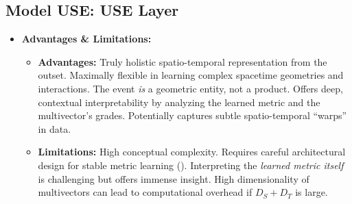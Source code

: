 \documentclass[11pt]{article}
\newcommand{\Cl}[2]{\text{Cl}(#1, #2)} %
\newcommand{\Ds}{D_S} %
\newcommand{\Dt}{D_T} %
\newcommand{\Hst}{h_{ST}} %
\newcommand{\Mvec}{\mathbf{M}} %
\newcommand{\CASMnet}{\text{CASM-Net}}
\newcommand{\SMPN}{\text{SMPN}}
\newenvironment{modeldescription}[1]{%
    \subsection*{Model #1: \MakeUppercase{#1} Layer}%
    \begin{itemize}[leftmargin=*,noitemsep]%
}{%
    \end{itemize}%
}
\begin{document}
\begin{modeldescription}{USE}
\begin{enumerate}[noitemsep]
\begin{itemize}[noitemsep]
            \item A learnable \textbf{Spacetime Multivector Parameterization Network (\SMPN)} \textit{also} takes $\Hst(k)$ as input.
                \begin{itemize}[noitemsep]
                    \item \texttt{SMPN\_input = \Hst(k)}.
                    \item \texttt{M\_k\_multivector\_coeffs = SMPN(SMPN\_input)}.
                \end{itemize}
            \item \textbf{\SMPN \ Output Interpretation:} \texttt{M\_k\_multivector\_coeffs} is a tensor containing the coefficients for \textit{all $2^{(\Ds+\Dt)}$ basis blades} of the general multivector $\Mvec_k \in \Cl{\Ds}{\Dt}$.
            \item \texttt{M\_k = sum(M\_k\_multivector\_coeffs[idx] * BasisBlade\_idx\_for\_event\_k)}.
            \item \textbf{Key Distinction:} $\Mvec_k$ is formed directly by the \SMPN, not via a geometric product of separate spatial and temporal entities. The ``fusion'' is implicit in the initial combined input and the direct parameterization of a unified spacetime entity.
        \end{itemize}
        \item \textbf{Output:} $\Mvec_k \in \Cl{\Ds}{\Dt}$ (a general multivector, a holistic spacetime entity, defined within its learned custom spacetime). Output is a tensor of shape \texttt{(2^(DS+DT),)}.
    \end{enumerate}

    \item \textbf{Advantages \& Limitations:}
    \begin{itemize}[noitemsep]
        \item \textbf{Advantages:} Truly holistic spatio-temporal representation from the outset. Maximally flexible in learning complex spacetime geometries and interactions. The event \textit{is} a geometric entity, not a product. Offers deep, contextual interpretability by analyzing the learned metric and the multivector's grades. Potentially captures subtle spatio-temporal ``warps'' in data.
        \item \textbf{Limitations:} High conceptual complexity. Requires careful architectural design for stable metric learning (\CASMnet). Interpreting the \textit{learned metric itself} is challenging but offers immense insight. High dimensionality of multivectors can lead to computational overhead if $\Ds+\Dt$ is large.
    \end{itemize}
\end{modeldescription}
\end{document}
